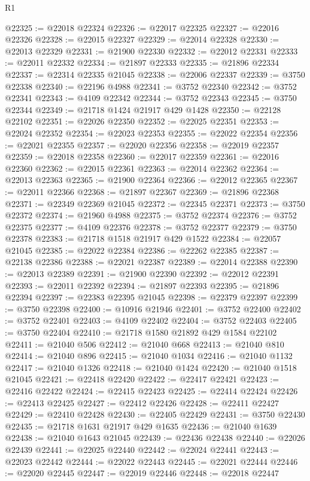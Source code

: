 \begin{lexlean}{R1}
\begin{coremodule}
@22325 := @22018 @22324
@22326 := @22017 @22325
@22327 := @22016 @22326
@22328 := @22015 @22327
@22329 := @22014 @22328
@22330 := @22013 @22329
@22331 := @21900 @22330
@22332 := @22012 @22331
@22333 := @22011 @22332
@22334 := @21897 @22333
@22335 := @21896 @22334
@22337 := @22314 @22335 @21045
@22338 := @22006 @22337
@22339 := @3750 @22338
@22340 := @22196 @4988
@22341 := @3752 @22340
@22342 := @3752 @22341
@22343 := @4109 @22342
@22344 := @3752 @22343
@22345 := @3750 @22344
@22349 := @21718 @1424 @21917 @429 @1428
@22350 := @22128 @22102
@22351 := @22026 @22350
@22352 := @22025 @22351
@22353 := @22024 @22352
@22354 := @22023 @22353
@22355 := @22022 @22354
@22356 := @22021 @22355
@22357 := @22020 @22356
@22358 := @22019 @22357
@22359 := @22018 @22358
@22360 := @22017 @22359
@22361 := @22016 @22360
@22362 := @22015 @22361
@22363 := @22014 @22362
@22364 := @22013 @22363
@22365 := @21900 @22364
@22366 := @22012 @22365
@22367 := @22011 @22366
@22368 := @21897 @22367
@22369 := @21896 @22368
@22371 := @22349 @22369 @21045
@22372 := @22345 @22371
@22373 := @3750 @22372
@22374 := @21960 @4988
@22375 := @3752 @22374
@22376 := @3752 @22375
@22377 := @4109 @22376
@22378 := @3752 @22377
@22379 := @3750 @22378
@22383 := @21718 @1518 @21917 @429 @1522
@22384 := @22057 @21045
@22385 := @22022 @22384
@22386 := @22262 @22385
@22387 := @22138 @22386
@22388 := @22021 @22387
@22389 := @22014 @22388
@22390 := @22013 @22389
@22391 := @21900 @22390
@22392 := @22012 @22391
@22393 := @22011 @22392
@22394 := @21897 @22393
@22395 := @21896 @22394
@22397 := @22383 @22395 @21045
@22398 := @22379 @22397
@22399 := @3750 @22398
@22400 := @10916 @21946
@22401 := @3752 @22400
@22402 := @3752 @22401
@22403 := @4109 @22402
@22404 := @3752 @22403
@22405 := @3750 @22404
@22410 := @21718 @1580 @21892 @429 @1584 @22102
@22411 := @21040 @506
@22412 := @21040 @668
@22413 := @21040 @810
@22414 := @21040 @896
@22415 := @21040 @1034
@22416 := @21040 @1132
@22417 := @21040 @1326
@22418 := @21040 @1424
@22420 := @21040 @1518 @21045
@22421 := @22418 @22420
@22422 := @22417 @22421
@22423 := @22416 @22422
@22424 := @22415 @22423
@22425 := @22414 @22424
@22426 := @22413 @22425
@22427 := @22412 @22426
@22428 := @22411 @22427
@22429 := @22410 @22428
@22430 := @22405 @22429
@22431 := @3750 @22430
@22435 := @21718 @1631 @21917 @429 @1635
@22436 := @21040 @1639
@22438 := @21040 @1643 @21045
@22439 := @22436 @22438
@22440 := @22026 @22439
@22441 := @22025 @22440
@22442 := @22024 @22441
@22443 := @22023 @22442
@22444 := @22022 @22443
@22445 := @22021 @22444
@22446 := @22020 @22445
@22447 := @22019 @22446
@22448 := @22018 @22447

\end{coremodule}
\end{lexlean}
